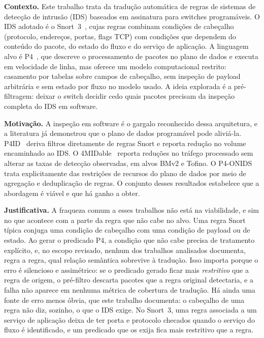 \documentclass[11pt,a4paper]{article}
\begin{document}
\textbf{Contexto.} Este trabalho trata da tradução automática de regras de
sistemas de detecção de intrusão (IDS) baseados em assinatura para switches
programáveis. O IDS adotado é o Snort~3~\cite{roesch1999snort,snort3manual},
cujas regras combinam condições de cabeçalho (protocolo, endereços, portas,
flags TCP) com condições que dependem do conteúdo do pacote, do estado do
fluxo e do serviço de aplicação. A linguagem alvo é P4~\cite{bosshart2014p4},
que descreve o processamento de pacotes no plano de dados e executa em
velocidade de linha, mas oferece um modelo computacional restrito: casamento
por tabelas sobre campos de cabeçalho, sem inspeção de payload arbitrária e
sem estado por fluxo no modelo usado. A ideia explorada é a pré-filtragem:
deixar o switch decidir cedo quais pacotes precisam da inspeção completa do
IDS em software.

\textbf{Motivação.} A inspeção em software é o gargalo reconhecido dessa
arquitetura, e a literatura já demonstrou que o plano de dados programável
pode aliviá-la. P4ID~\cite{lewis2019p4id} deriva filtros diretamente de
regras Snort e reporta redução no volume encaminhado ao IDS. O
4MIDable~\cite{lewis2023fourmidable} reporta reduções no tráfego processado
sem alterar as taxas de detecção observadas, em alvos BMv2 e Tofino. O
P4-ONIDS~\cite{tavares2021p4onids} trata explicitamente das restrições de
recursos do plano de dados por meio de agregação e deduplicação de regras. O
conjunto desses resultados estabelece que a abordagem é viável e que há ganho
a obter.

\textbf{Justificativa.} A fraqueza comum a esses trabalhos não está na
viabilidade, e sim no que acontece com a parte da regra que não cabe no alvo.
Uma regra Snort típica conjuga uma condição de cabeçalho com uma condição de
payload ou de estado. Ao gerar o predicado P4, a condição que não cabe precisa
de tratamento explícito, e, no escopo revisado, nenhum dos trabalhos
analisados documenta, regra a regra, qual relação semântica sobrevive à
tradução. Isso importa porque o erro é silencioso e assimétrico: se o
predicado gerado ficar mais \emph{restritivo} que a regra de origem, o
pré-filtro descarta pacotes que a regra original detectaria, e a falha não
aparece em nenhuma métrica de cobertura de tradução. Há ainda uma fonte de
erro menos óbvia, que este trabalho documenta: o cabeçalho de uma regra não
diz, sozinho, o que o IDS exige. No Snort~3, uma regra associada a um serviço
de aplicação deixa de ter porta e protocolo checados quando o serviço do fluxo
é identificado, e um predicado que os exija fica mais restritivo que a regra.
\end{document}
